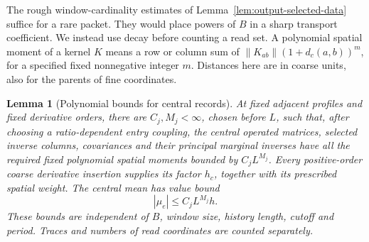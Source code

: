 \documentclass[11pt,reqno]{amsart}
\numberwithin{equation}{section}
\newtheorem{lemma}[theorem]{Lemma}
\theoremstyle{definition}
\theoremstyle{remark}
\begin{document}
The rough window-cardinality estimates of
Lemma~\ref{lem:output-selected-data} suffice for a rare packet.
They would place powers of \(B\) in a sharp transport
coefficient. We instead use decay before counting a read set.
A polynomial spatial moment of a kernel \(K\) means a row
or column sum of \(\|K_{ab}\|(1+d_c(a,b))^m\), for a specified
fixed nonnegative integer \(m\). Distances here are in coarse
units, also for the parents of fine coordinates.

\begin{lemma}[Polynomial bounds for central records]
\label{lem:central-polynomial-ratio}
At fixed adjacent profiles and fixed derivative orders, there
are \(C_j,M_j<\infty\), chosen before \(L\), such that, after
choosing a ratio-dependent entry coupling, the central operated
matrices, selected inverse columns, covariances and their
principal marginal inverses have all the required fixed
polynomial spatial moments bounded by \(C_jL^{M_j}\).
Every positive-order coarse derivative insertion supplies its
factor \(h_c\), together with its prescribed spatial weight.
The central mean has value bound
\begin{equation}
                         |\mu_e|\le C_jL^{M_j}h.
 \label{eq:central-polynomial-mean}
\end{equation}
These bounds are independent of \(B\), window size, history
length, cutoff and period. Traces and numbers of read
coordinates are counted separately.
\end{lemma}
\end{document}
